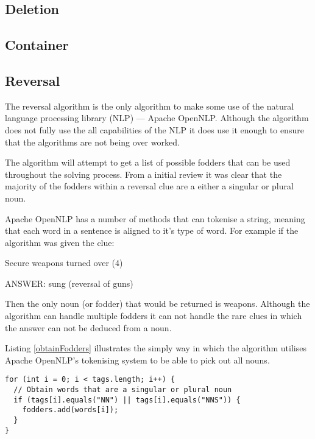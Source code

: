\subsection{Deletion}

\subsection{Container}

\subsection{Reversal}

The reversal algorithm is the only algorithm to make some use of the natural 
language processing library (NLP) --- Apache OpenNLP. Although the algorithm 
does not fully use the all capabilities of the NLP it does use it enough to 
ensure that the algorithms are not being over worked.

The algorithm will attempt to get a list of possible fodders that can be used 
throughout the solving process. From a initial review it was clear that the 
majority of the fodders within a reversal clue are a either a singular or plural
noun.

Apache OpenNLP has a number of methods that can tokenise a string, meaning that 
each word in a sentence is aligned to it's type of word. For example if the 
algorithm was given the clue:

Secure weapons turned over (4)

ANSWER: sung (reversal of guns)

Then the only noun (or fodder) that would be returned is weapons. Although the 
algorithm can handle multiple fodders it can not handle the rare clues in which
the answer can not be deduced from a noun.

Listing \ref{obtainFodders} illustrates the simply way in which the algorithm 
utilises Apache OpenNLP's tokenising system to be able to pick out all nouns.

\begin{lstlisting}[caption={Deducing all singular or plural nouns within the clue},
                   label=obtainFodders]  
for (int i = 0; i < tags.length; i++) {
  // Obtain words that are a singular or plural noun
  if (tags[i].equals("NN") || tags[i].equals("NNS")) {
    fodders.add(words[i]);
  }
}
\end{lstlisting}

